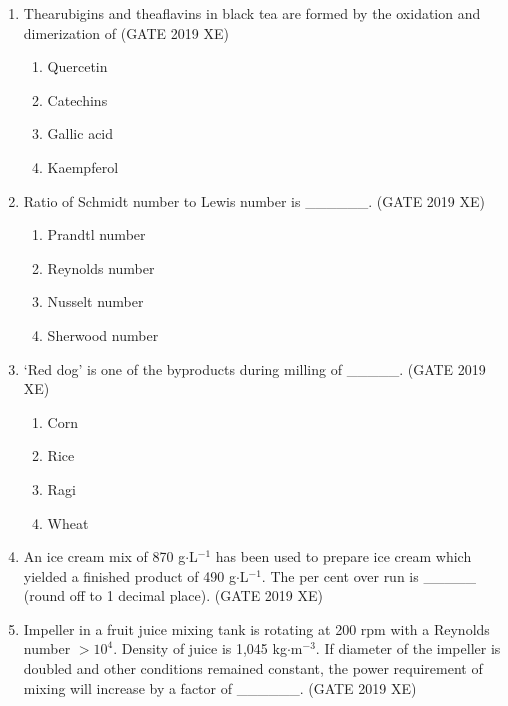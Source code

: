 \documentclass[journal,12pt,onecolumn]{IEEEtran}
\begin{document}
\begin{enumerate}
\item Thearubigins and theaflavins in black tea are formed by the oxidation and dimerization of
\hfill{(GATE 2019 XE)} \\
\begin{multicols}{2}
\begin{enumerate}
\item Quercetin
\item Catechins
\item Gallic acid
\item Kaempferol
\end{enumerate}
\end{multicols}


\item Ratio of Schmidt number to Lewis number is \_\_\_\_\_\_.
\hfill{(GATE 2019 XE)} \\
\begin{multicols}{2}
\begin{enumerate}
\item Prandtl number
\item Reynolds number
\item Nusselt number
\item Sherwood number
\end{enumerate}
\end{multicols}


\item `Red dog' is one of the byproducts during milling of \_\_\_\_\_.
\hfill{(GATE 2019 XE)} \\
\begin{multicols}{2}
\begin{enumerate}
\item Corn
\item Rice
\item Ragi
\item Wheat
\end{enumerate}
\end{multicols}


\item An ice cream mix of 870 g$\cdot$L$^{-1}$ has been used to prepare ice cream which yielded a finished product of 490 g$\cdot$L$^{-1}$. The per cent over run is \_\_\_\_\_ (round off to 1 decimal place).
\hfill{(GATE 2019 XE)} \\


\item Impeller in a fruit juice mixing tank is rotating at 200 rpm with a Reynolds number $>10^{4}$. Density of juice is 1,045 kg$\cdot$m$^{-3}$. If diameter of the impeller is doubled and other conditions remained constant, the power requirement of mixing will increase by a factor of \_\_\_\_\_\_.
\hfill{(GATE 2019 XE)} \\



\end{enumerate}
\end{document}
